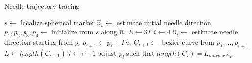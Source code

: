 
\begin{algorithm}
\caption{Needle trajectory tracing}
\begin{algorithmic}
  \STATE $s\leftarrow$ localize spherical marker
  \STATE $\hat{n}_1 \leftarrow$ estimate initial needle direction
  \STATE $p_1, p_2, p_3, p_4 \leftarrow$ initialize from $s$ along $\hat{n}_1$
  \STATE $L\leftarrow 3\Gamma$ 
  \STATE $i\leftarrow 4$
    \STATE $\hat{n}_{i} \leftarrow$ estimate needle direction starting from $p_i$
    \STATE $p_{i+1} \leftarrow p_i + \Gamma \hat{n}_{i}$
    \STATE $C_{i+1}\leftarrow$ bezier curve from $p_1, ..., p_{i+1}$
    \STATE $L\leftarrow length(C_{i+1})$ 
    \STATE $i\leftarrow i+1$
  \ENDWHILE
  \STATE adjust $p_i$ such that $length(C_i) = L_{marker,tip}$
\end{algorithmic}
\end{algorithm}

